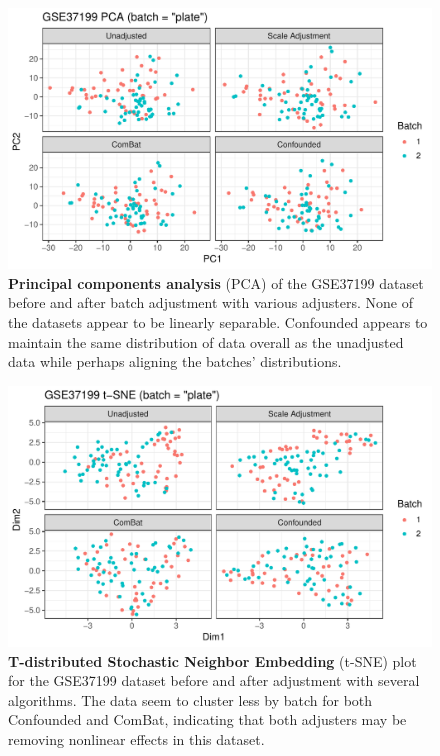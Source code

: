 \documentclass[notitlepage]{article}
\begin{document}
\begin{figure}
	\centering
	\includegraphics[width=\columnwidth]{figures/final/pca}
	\caption{\textbf{Principal components analysis} (PCA) of the GSE37199 dataset before and after batch adjustment with various adjusters.
	None of the datasets appear to be linearly separable.
	Confounded appears to maintain the same distribution of data overall as the unadjusted data while perhaps aligning the batches' distributions.}
	\label{fig:pca}
\end{figure}
\begin{figure}
	\centering
	\includegraphics[width=\columnwidth]{figures/final/tsne}
	\caption{\textbf{T-distributed Stochastic Neighbor Embedding} (t-SNE) plot for the GSE37199 dataset before and after adjustment with several algorithms.
	The data seem to cluster less by batch for both Confounded and ComBat, indicating that both adjusters may be removing nonlinear effects in this dataset.}
	\label{fig:tsne}
\end{figure}
\end{document}
